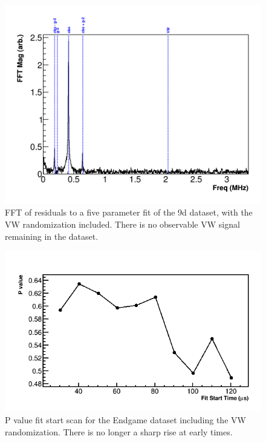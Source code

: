 \documentclass[12pt,letterpaper]{article}
\begin{document}
\begin{figure}[]
    \centering
    \includegraphics[width=\textwidth]{FFT_fiveParameter_9d_fVWRand}
    \caption[]{FFT of residuals to a five parameter fit of the 9d dataset, with the VW randomization included. There is no observable VW signal remaining in the dataset.}
    \label{fig:FFT_fiveParam_fVWRand}
\end{figure}

\begin{figure}[]
    \centering
    \includegraphics[width=.7\textwidth]{Pvalue_Endgame_withRand}
    \caption[]{P value fit start scan for the Endgame dataset including the VW randomization. There is no longer a sharp rise at early times.}
    \label{fig:Pval_Endgame_withVWRand}
\end{figure}
\end{document}
